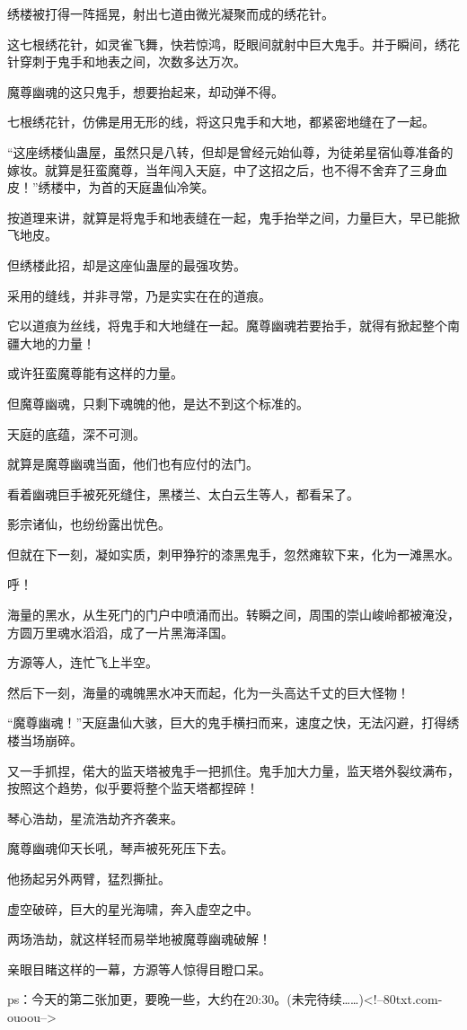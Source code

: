 \begin{this_body}
绣楼被打得一阵摇晃，射出七道由微光凝聚而成的绣花针。

这七根绣花针，如灵雀飞舞，快若惊鸿，眨眼间就射中巨大鬼手。并于瞬间，绣花针穿刺于鬼手和地表之间，次数多达万次。

魔尊幽魂的这只鬼手，想要抬起来，却动弹不得。

七根绣花针，仿佛是用无形的线，将这只鬼手和大地，都紧密地缝在了一起。

“这座绣楼仙蛊屋，虽然只是八转，但却是曾经元始仙尊，为徒弟星宿仙尊准备的嫁妆。就算是狂蛮魔尊，当年闯入天庭，中了这招之后，也不得不舍弃了三身血皮！”绣楼中，为首的天庭蛊仙冷笑。

按道理来讲，就算是将鬼手和地表缝在一起，鬼手抬举之间，力量巨大，早已能掀飞地皮。

但绣楼此招，却是这座仙蛊屋的最强攻势。

采用的缝线，并非寻常，乃是实实在在的道痕。

它以道痕为丝线，将鬼手和大地缝在一起。魔尊幽魂若要抬手，就得有掀起整个南疆大地的力量！

或许狂蛮魔尊能有这样的力量。

但魔尊幽魂，只剩下魂魄的他，是达不到这个标准的。

天庭的底蕴，深不可测。

就算是魔尊幽魂当面，他们也有应付的法门。

看着幽魂巨手被死死缝住，黑楼兰、太白云生等人，都看呆了。

影宗诸仙，也纷纷露出忧色。

但就在下一刻，凝如实质，刺甲狰狞的漆黑鬼手，忽然瘫软下来，化为一滩黑水。

呼！

海量的黑水，从生死门的门户中喷涌而出。转瞬之间，周围的崇山峻岭都被淹没，方圆万里魂水滔滔，成了一片黑海泽国。

方源等人，连忙飞上半空。

然后下一刻，海量的魂魄黑水冲天而起，化为一头高达千丈的巨大怪物！

“魔尊幽魂！”天庭蛊仙大骇，巨大的鬼手横扫而来，速度之快，无法闪避，打得绣楼当场崩碎。

又一手抓捏，偌大的监天塔被鬼手一把抓住。鬼手加大力量，监天塔外裂纹满布，按照这个趋势，似乎要将整个监天塔都捏碎！

琴心浩劫，星流浩劫齐齐袭来。

魔尊幽魂仰天长吼，琴声被死死压下去。

他扬起另外两臂，猛烈撕扯。

虚空破碎，巨大的星光海啸，奔入虚空之中。

两场浩劫，就这样轻而易举地被魔尊幽魂破解！

亲眼目睹这样的一幕，方源等人惊得目瞪口呆。

ps：今天的第二张加更，要晚一些，大约在20:30。(未完待续……)<!--80txt.com-ouoou-->

\end{this_body}


